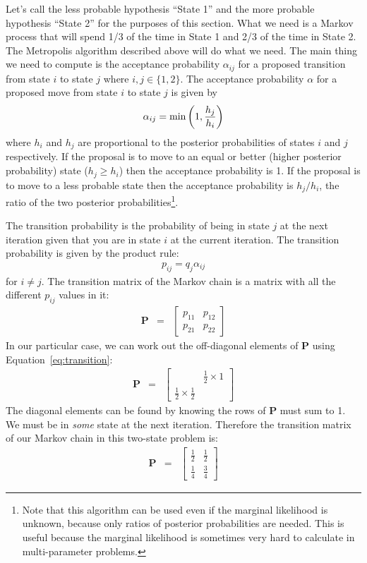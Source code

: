 Let's
call the less probable hypothesis ``State 1'' and the more probable hypothesis
``State 2'' for the purposes of this section.
What we need is a Markov process that will spend 1/3 of the time in State 1 and
2/3 of the time in State 2. The Metropolis algorithm described above will
do what we need. The main thing we need to compute is the acceptance probability
$\alpha_{ij}$ for a proposed transition from state $i$ to state $j$ where
$i, j \in \{1, 2\}$.
The acceptance probability $\alpha$ for a proposed move from state $i$ to
state $j$ is given by
\begin{eqnarray}
\alpha_{ij} = \textnormal{min}\left(1, \frac{h_j}{h_i}\right)
\end{eqnarray}
where $h_i$ and $h_j$ are proportional to the posterior probabilities of
states $i$ and $j$ respectively. If the proposal is to move
to an equal or better (higher posterior probability)
state ($h_j \geq h_i$) then the acceptance probability is 1.
If the proposal is to move to a less probable state then the acceptance probability
is $h_j/h_i$, the ratio of the two posterior probabilities\footnote{Note that
this algorithm can be used even if the marginal likelihood is unknown, because
only ratios of posterior probabilities are needed. This is useful because the
marginal likelihood is sometimes very hard to calculate in multi-parameter
problems.}.

The transition probability is the probability
of being in state $j$ at the next iteration given that you are in state $i$
at the current iteration. The transition probability is given by the product
rule:
\begin{eqnarray}
p_{ij} = q_j \alpha_{ij}\label{eq:transition}
\end{eqnarray}
for $i \neq j$.
The transition matrix of the Markov chain is a matrix with all the different
$p_{ij}$ values in it:
\begin{eqnarray}
\mathbf{P} &=&
\left[
\begin{array}{cc}
p_{11} & p_{12}\\
p_{21} & p_{22}
\end{array}
\right]
\end{eqnarray}
In our particular case, we can work out the off-diagonal elements of
$\mathbf{P}$ using Equation~\ref{eq:transition}:
\begin{eqnarray}
\mathbf{P}
&=&
\left[
\begin{array}{cc}
 & \frac{1}{2} \times 1\\
\frac{1}{2}\times\frac{1}{2} & 
\end{array}
\right]
\end{eqnarray}
The diagonal elements can be found by knowing the rows of $\mathbf{P}$ must
sum to 1. We must be in {\it some} state at the next iteration. Therefore the
transition matrix of our Markov chain in this two-state problem is:
\begin{eqnarray}
\mathbf{P}
&=&
\left[
\begin{array}{cc}
\frac{1}{2} & \frac{1}{2}\\
\frac{1}{4} & \frac{3}{4}
\end{array}
\right]\label{eq:p_matrix}
\end{eqnarray}

